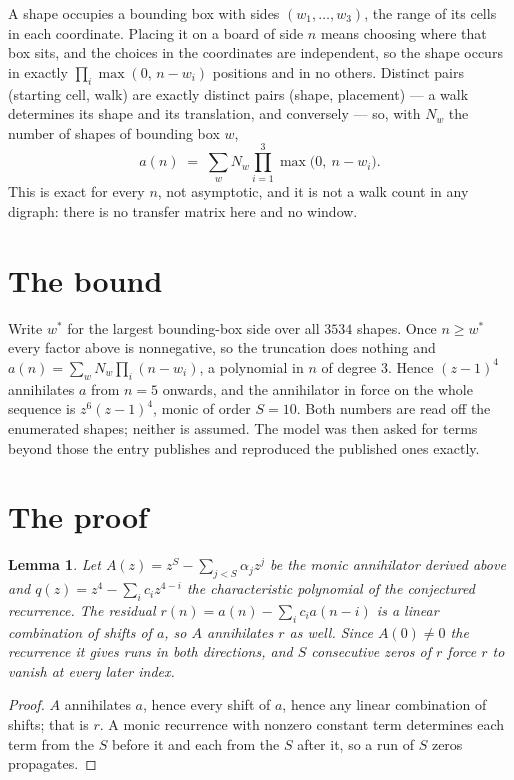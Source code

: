 \documentclass[11pt,a4paper]{article}
\theoremstyle{plain}
\newtheorem{lemma}[theorem]{Lemma}
\theoremstyle{definition}
\begin{document}
A shape occupies a bounding box with sides $(w_1,\dots,w_{3})$, the range of its cells in each
coordinate. Placing it on a board of side $n$ means choosing where that box sits, and the
choices in the coordinates are independent, so the shape occurs in exactly
$\prod_{i}\max(0,\,n-w_i)$ positions and in no others. Distinct pairs (starting cell,
walk) are exactly distinct pairs (shape, placement) --- a walk determines its shape and its
translation, and conversely --- so, with $N_w$ the number of shapes of bounding box $w$,
\[
a(n)\;=\;\sum_{w} N_w \prod_{i=1}^{3}\max\bigl(0,\ n-w_i\bigr).
\]
This is exact for every $n$, not asymptotic, and it is not a walk count in any digraph: there is
no transfer matrix here and no window.

\section{The bound}

Write $w^\ast$ for the largest bounding-box side over all $3534$ shapes. Once $n\ge w^\ast$
every factor above is nonnegative, so the truncation does nothing and
$a(n)=\sum_w N_w\prod_i(n-w_i)$, a polynomial in $n$ of degree $3$. Hence $(z-1)^{4}$
annihilates $a$ from $n=5$ onwards, and the annihilator in force on the whole sequence is
$z^{6}(z-1)^{4}$, monic of order $S=10$. Both numbers are read off the enumerated
shapes; neither is assumed. The model was then asked for terms beyond those the entry publishes
and reproduced the published ones exactly.

\section{The proof}

\begin{lemma}\label{lem:crit}
Let $A(z)=z^S-\sum_{j<S}\alpha_jz^{j}$ be the monic annihilator derived above and
$q(z)=z^{4}-\sum_ic_iz^{4-i}$ the characteristic polynomial of the conjectured
recurrence. The residual $r(n)=a(n)-\sum_ic_ia(n-i)$ is a linear combination of shifts of $a$,
so $A$ annihilates $r$ as well. Since $A(0)\ne0$ the recurrence it gives runs in both
directions, and $S$ consecutive zeros of $r$ force $r$ to vanish at every later index.
\end{lemma}

\begin{proof}
$A$ annihilates $a$, hence every shift of $a$, hence any linear combination of shifts; that is
$r$. A monic recurrence with nonzero constant term determines each term from the $S$ before it
and each from the $S$ after it, so a run of $S$ zeros propagates.
\end{proof}
\end{document}
